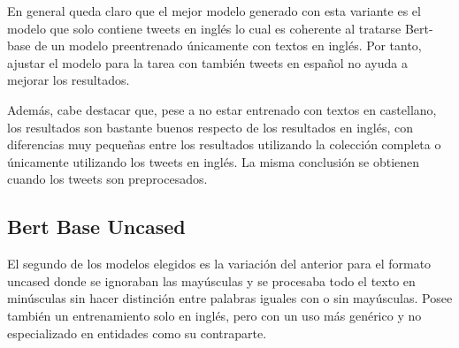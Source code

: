 En general queda claro que el mejor modelo generado con esta variante es el modelo que solo contiene tweets en inglés lo cual es coherente al tratarse Bert-base de un modelo preentrenado únicamente con textos en inglés. Por tanto, ajustar el modelo para la tarea con también tweets en español no ayuda a mejorar los resultados. 


Además, cabe destacar que, pese a no estar entrenado con textos en castellano, los resultados son bastante buenos respecto de los resultados en inglés, con diferencias muy pequeñas entre los resultados utilizando la colección completa o únicamente utilizando los tweets en inglés. La misma conclusión se obtienen cuando los tweets son preprocesados.

\subsection{Bert Base Uncased}
El segundo de los modelos elegidos es la variación del anterior para el formato uncased donde se ignoraban las mayúsculas y se procesaba todo el texto en minúsculas sin hacer distinción entre palabras iguales con o sin mayúsculas. Posee también un entrenamiento solo en inglés, pero con un uso más genérico y no especializado en entidades como su contraparte.

